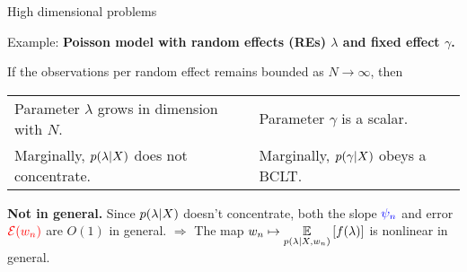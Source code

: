\begin{frame}{High dimensional problems}


Example: \textbf{Poisson model with random effects (REs)
$\lambda$ and fixed effect $\gamma$.}

If the observations per random effect remains bounded as $N \rightarrow
\infty$, then

\begin{tabular}{ll}
    Parameter $\lambda$ grows in dimension with $N$.& 
    Parameter $\gamma$ is a scalar. \\
    Marginally, $p(\lambda \vert X)$ does not concentrate. &
    Marginally, $p(\gamma \vert X)$ obeys a BCLT. \\
\end{tabular}
%
%


\textbf{Not in general. }
Since $p(\lambda \vert X)$ doesn't concentrate, both the slope $\textcolor{blue}{\psi_n}$ and
error $\textcolor{red}{\mathcal{E}(w_n)}$ are $O(1)$ in general.
%
$\Rightarrow$ The map
$w_n \mapsto \underset{p(\lambda \vert X, w_n)}{\mathbb{E}}\left[f(\lambda)\right]$ is nonlinear in general.


\end{frame}
